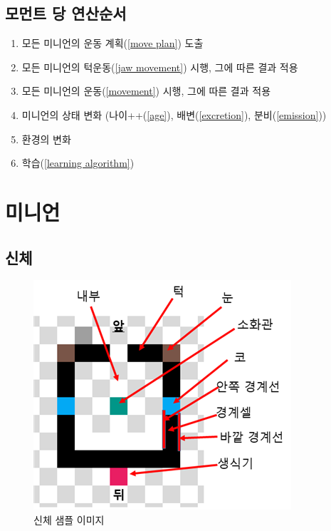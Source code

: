 \documentclass[a4paper,12pt]{article}
\begin{document}
\subsection{모먼트 당 연산순서}\label{computing order}
\begin{enumerate}
\item 모든 미니언의 운동 계획(\ref{move plan}) 도출 
\item 모든 미니언의 턱운동(\ref{jaw movement}) 시행, 그에 따른 결과 적용 
\item 모든 미니언의 운동(\ref{movement}) 시행, 그에 따른 결과 적용 
\item 미니언의 상태 변화 (나이++(\ref{age}), 배변(\ref{excretion}), 분비(\ref{emission}))  
\item 환경의 변화 
\item 학습(\ref{learning algorithm})
\end{enumerate}
\section{미니언}
\subsection{신체}\label{body}
\begin{figure}[h]
\includegraphics[scale=0.8]{minion_body_sample.png}
\centering
\caption{신체 샘플 이미지}
\label{figure:body}
\end{figure}
\end{document}
